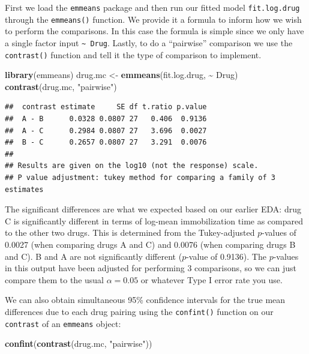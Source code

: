\documentclass[
]{book}
\newenvironment{Shaded}{\begin{snugshade}}{\end{snugshade}}
\newcommand{\FunctionTok}[1]{\textcolor[rgb]{0.13,0.29,0.53}{\textbf{#1}}}
\newcommand{\NormalTok}[1]{#1}
\newcommand{\OtherTok}[1]{\textcolor[rgb]{0.56,0.35,0.01}{#1}}
\newcommand{\SpecialCharTok}[1]{\textcolor[rgb]{0.81,0.36,0.00}{\textbf{#1}}}
\newcommand{\StringTok}[1]{\textcolor[rgb]{0.31,0.60,0.02}{#1}}
\begin{document}
First we load the \texttt{emmeans} package and then run our fitted model \texttt{fit.log.drug} through the \texttt{emmeans()} function. We provide it a formula to inform how we wish to perform the comparisons. In this case the formula is simple since we only have a single factor input \texttt{\textasciitilde{}\ Drug}. Lastly, to do a ``pairwise'' comparison we use the \texttt{contrast()} function and tell it the type of comparison to implement.

\begin{Shaded}
\begin{Highlighting}[]
\FunctionTok{library}\NormalTok{(emmeans)}
\NormalTok{drug.mc }\OtherTok{\textless{}{-}} \FunctionTok{emmeans}\NormalTok{(fit.log.drug, }\SpecialCharTok{\textasciitilde{}}\NormalTok{ Drug)}
\FunctionTok{contrast}\NormalTok{(drug.mc, }\StringTok{"pairwise"}\NormalTok{)}
\end{Highlighting}
\end{Shaded}

\begin{verbatim}
##  contrast estimate     SE df t.ratio p.value
##  A - B      0.0328 0.0807 27   0.406  0.9136
##  A - C      0.2984 0.0807 27   3.696  0.0027
##  B - C      0.2657 0.0807 27   3.291  0.0076
## 
## Results are given on the log10 (not the response) scale. 
## P value adjustment: tukey method for comparing a family of 3 estimates
\end{verbatim}

The significant differences are what we expected based on our earlier EDA: drug C is significantly different in terms of log-mean immobilization time as compared to the other two drugs.
This is determined from the Tukey-adjusted \(p\)-values of 0.0027 (when comparing drugs A and C) and 0.0076 (when comparing drugs B and C). B and A are not significantly different (\(p\)-value of 0.9136).
The \(p\)-values in this output have been adjusted for performing 3 comparisons, so we can just compare them to the usual \(\alpha=0.05\) or whatever Type I error rate you use.

We can also obtain simultaneous 95\% confidence intervals for the true mean differences due to each drug pairing using the \texttt{confint()} function on our \texttt{contrast} of an \texttt{emmeans} object:

\begin{Shaded}
\begin{Highlighting}[]
\FunctionTok{confint}\NormalTok{(}\FunctionTok{contrast}\NormalTok{(drug.mc, }\StringTok{"pairwise"}\NormalTok{))}
\end{Highlighting}
\end{Shaded}
\end{document}
